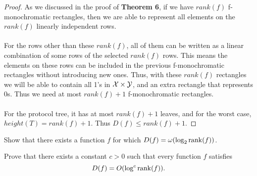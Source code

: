\begin{proof}
	As we discussed in the proof of \textbf{Theorem 6}, if we have $rank(f)$ f-monochromatic rectangles, then we are able to represent all elements on the $rank(f)$ linearly independent rows. \\
	\\
	For the rows other than these $rank(f)$, all of them can be written as a linear combination of some rows of the selected $rank(f)$ rows. This means the elements on these rows can be included in the previous f-monochromatic rectangles without introducing new ones. Thus, with these $rank(f)$ rectangles we will be able to contain all 1's in $\mathcal{X} \times \mathcal{Y}$, and an extra rectangle that represents $0$s. Thus we need at most $rank(f)+1$ f-monochromatic rectangles.\\
	\\
	For the protocol tree, it has at most $rank(f)+1$ leaves, and for the worst case, $height(T) = rank(f)+1$. Thus $D(f) \leq rank(f)+1$.
\end{proof}

\exercises

\begin{exercise} %
	Show that there exists a function $f$ for which $D(f) = \omega( \log_2 \mathrm{rank}(f) )$.
\end{exercise}

\begin{open}
	Prove that there exists a constant $c > 0$ such that every function $f$ satisfies
	\[
	D(f) = O( \log^c \mathrm{rank}(f)).
	\]
\end{open}